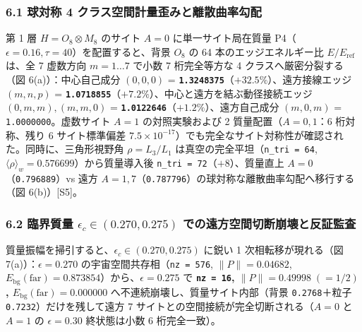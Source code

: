 \documentclass[
  a4paper,
]{ltjsarticle}
\begin{document}
\subsubsection{6.1 球対称 4
クラス空間計量歪みと離散曲率勾配}\label{ux7403ux5bfeux79f0-4-ux30afux30e9ux30b9ux7a7aux9593ux8a08ux91cfux6b6aux307fux3068ux96e2ux6563ux66f2ux7387ux52feux914d}

第 1 層 \(H = O_8 \otimes M_8\) のサイト \(A = 0\) に単一サイト局在質量
P4（\(\epsilon = 0.16, \tau = 40\)）を配置すると、背景 \(O_8\) の 64
本のエッジエネルギー比 \(E/E_{\mathrm{ref}}\) は、全 7 虚数方向
\(m = 1 \dots 7\) で小数 7 桁完全等方な 4 クラスへ厳密分裂する（図
6(a)）：中心自己成分 \((0,0,0)\) =
\textbf{\texttt{1.3248375}}（\(+32.5\%\)）、遠方接線エッジ \((m,n,p)\) =
\textbf{\texttt{1.0718855}}（\(+7.2\%\)）、中心と遠方を結ぶ動径接続エッジ
\((0,m,m), (m,m,0)\) =
\textbf{\texttt{1.0122646}}（\(+1.2\%\)）、遠方自己成分 \((m,0,m)\) =
\texttt{1.0000000}。虚数サイト \(A = 1\) の対照実験および 2
質量配置（\(A=0,1\)：6 桁対称、残り 6 サイト標準偏差
\(7.5\times 10^{-17}\)）でも完全なサイト対称性が確認された。同時に、三角形視野角
\(\rho = L_3/L_1\) は真空の完全平坦（\texttt{n\_tri\ =\ 64},
\(\langle\rho\rangle_w = 0.576699\)）から質量導入後
\texttt{n\_tri\ =\ 72}（\(+8\)）、質量直上
\(A=0\)（\texttt{0.796889}）vs 遠方
\(A=1,7\)（\texttt{0.787796}）の球対称な離散曲率勾配へ移行する（図
6(b)）{[}S5{]}。

\subsubsection{\texorpdfstring{6.2 臨界質量
\(\epsilon_c \in (0.270, 0.275)\)
での遠方空間切断崩壊と反証監査}{6.2 臨界質量 \textbackslash epsilon\_c \textbackslash in (0.270, 0.275) での遠方空間切断崩壊と反証監査}}\label{ux81e8ux754cux8ceaux91cf-epsilon_c-in-0.270-0.275-ux3067ux306eux9060ux65b9ux7a7aux9593ux5207ux65adux5d29ux58caux3068ux53cdux8a3cux76e3ux67fb}

質量振幅を掃引すると、\(\epsilon_c \in (0.270, 0.275)\) に鋭い 1
次相転移が現れる（図 7(a)）：\(\epsilon = 0.270\)
の宇宙空間共存相（\texttt{nz\ =\ 576}, \(\|P\| = 0.04682\),
\(E_{\mathrm{bg}}(\mathrm{far}) = 0.873854\)）から、\(\epsilon = 0.275\)
で \textbf{\texttt{nz\ =\ 16}, \(\|P\| = 0.49998\;(=1/2)\),
\(E_{\mathrm{bg}}(\mathrm{far}) = 0.000000\)}
へ不連続崩壊し、質量サイト内部（背景 \texttt{0.2768}＋粒子
\texttt{0.7232}）だけを残して遠方 7
サイトとの空間接続が完全切断される（\(A=0\) と \(A=1\) の
\(\epsilon=0.30\) 終状態は小数 6 桁完全一致）。
\end{document}
